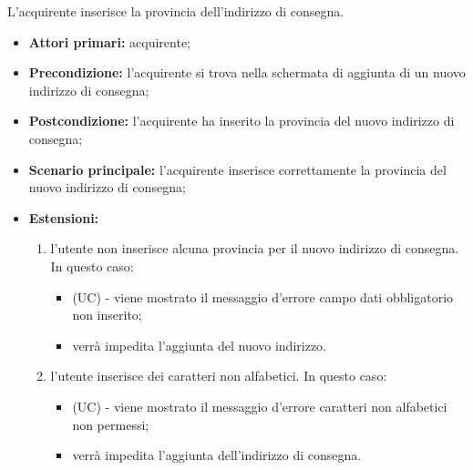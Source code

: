L'acquirente inserisce la provincia dell'indirizzo di consegna.
\begin{itemize}
    \item \textbf{Attori primari:} acquirente;
    \item \textbf{Precondizione:} l'acquirente si trova nella schermata di aggiunta di un nuovo indirizzo di consegna;
    \item \textbf{Postcondizione:} l'acquirente ha inserito la provincia del nuovo indirizzo di consegna;
    \item \textbf{Scenario principale:} l'acquirente inserisce correttamente la provincia del nuovo indirizzo di consegna;
    \item \textbf{Estensioni:}
    \begin{enumerate}[label=\lett]
        \item l'utente non inserisce alcuna provincia per il nuovo indirizzo di consegna. In questo caso:
        \begin{itemize}
            \item (UC) - viene mostrato il messaggio d'errore campo dati obbligatorio non inserito;
            \item verrà impedita l'aggiunta del nuovo indirizzo.
        \end{itemize}
        \item l'utente inserisce dei caratteri non alfabetici. In questo caso:
        \begin{itemize}
            \item (UC) - viene mostrato il messaggio d'errore caratteri non alfabetici non permessi;
            \item verrà impedita l'aggiunta dell'indirizzo di consegna.
        \end{itemize}
    \end{enumerate}
\end{itemize}

